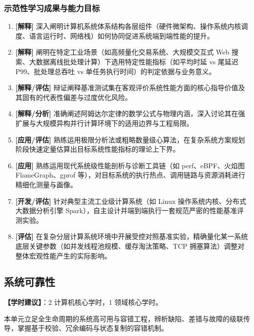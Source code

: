 \subsubsection{示范性学习成果与能力目标}
\begin{enumerate}
    \item \textbf{[解释]} 深入阐明计算机系统体系结构各层组件（硬件微架构、操作系统内核调度、语言运行时、网络栈）如何协同促进系统端到端性能的提升。
    \item \textbf{[解释]} 阐明在特定工业场景（如高频量化交易系统、大规模交互式 Web 搜索、大数据离线批处理计算）下选用特定性能指标（如平均时延 vs 尾延迟 P99、批处理总吞吐 vs 单任务执行时间）的判定依据与业务意义。
    \item \textbf{[解释/评估]} 辩证阐释基准测试集在客观评价系统性能方面的核心指导价值及其固有的代表性偏差与过度优化风险。
    \item \textbf{[解释/分析]} 准确阐述阿姆达尔定律的数学公式与物理内涵，深入讨论其在强扩展与大规模异构并行计算环境下的适用边界与工程局限。
    \item \textbf{[应用/评估]} 熟练运用极限分析法或粗略数量级心算法，在复杂系统方案规划阶段快速定量估算出目标系统性能指标的理论上下界。
    \item \textbf{[应用]} 熟练运用现代系统级性能剖析与诊断工具链（如 perf、eBPF、火焰图 FlameGraph、gprof 等），对目标系统的执行热点、调用链路与资源消耗进行精细化测量与画像。
    \item \textbf{[开发/评估]} 针对典型主流工业级计算系统（如 Linux 操作系统内核、分布式大数据分析引擎 Spark），自主设计并端到端执行一套规范严密的性能基准评测实验。
    \item \textbf{[评估]} 在复杂分层计算系统环境中开展受控对照基准实验，精确量化某一系统底层关键参数（如并发线程池规模、缓存淘汰策略、TCP 拥塞算法）调整对整体宏观性能产生的实际影响。
\end{enumerate}

\subsection{系统可靠性}
\textbf{【学时建议】}：2 计算机核心学时，1 领域核心学时。

本单元立足全生命周期的系统高可用与容错工程，辨析缺陷、差错与故障的级联传导，掌握基于校验、冗余编码与状态复制的容错机制。

